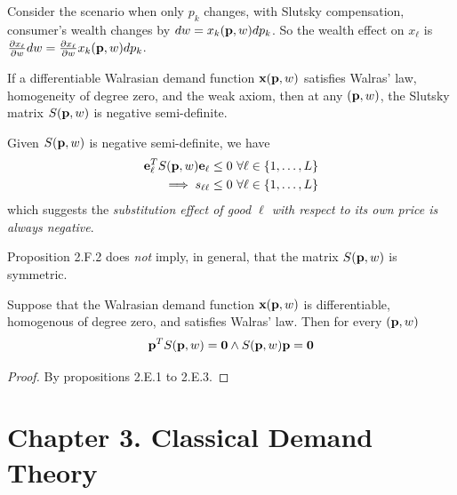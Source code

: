 \documentclass{article}
\begin{document}
 			\begin{remark}
 				Consider the scenario when only $p_k$ changes, with Slutsky compensation, consumer's wealth changes by $dw = x_k(\textbf{p}, w) dp_k$. So the wealth effect on $x_\ell$ is $\frac{\partial{x_\ell}}{\partial{w}} dw = \frac{\partial{x_\ell}}{\partial{w}} x_k(\textbf{p}, w) dp_k$.
 			\end{remark}
 			
 			\begin{proposition}[2.F.2]
 				If a differentiable Walrasian demand function $\textbf{x}(\textbf{p}, w)$ satisfies Walras' law, homogeneity of degree zero, and the weak axiom, then at any $(\textbf{p}, w)$, the Slutsky matrix $S(\textbf{p}, w)$ is negative semi-definite.
 			\end{proposition}
 			
 			\begin{corollary}
 				Given $S(\textbf{p}, w)$ is negative semi-definite, we have
 				\begin{align}
 					\ve{e}_{\ell}^T S(\vep, w) \ve{e}_{\ell} \leq 0\ \forall \ell \in \{1, \ldots, L\} \\
 					\implies s_{\ell \ell} \leq 0\ \forall \ell \in \{1, \ldots, L\}
 				\end{align}
 				which suggests the \emph{substitution effect of good $\ell$ with respect to its own price is always negative}.
 			\end{corollary}
 			
 			\begin{remark}
 				Proposition 2.F.2 does \emph{not} imply, in general, that the matrix $S(\textbf{p}, w)$ is symmetric.
 			\end{remark}
 			
 			\begin{proposition}[2.F.3]
 				Suppose that the Walrasian demand function $\textbf{x}(\textbf{p}, w)$ is differentiable, homogenous of degree zero, and satisfies Walras' law. Then for every $(\textbf{p}, w)$
 				\begin{equation}
 					\textbf{p}^T S(\textbf{p}, w) = \textbf{0} \land S(\textbf{p}, w) \textbf{p} = \textbf{0}
 				\end{equation}
 				\begin{proof}
 					By propositions 2.E.1 to 2.E.3.
 				\end{proof}
 			\end{proposition}
 	
 	\section{Chapter 3. Classical Demand Theory}
\end{document}
